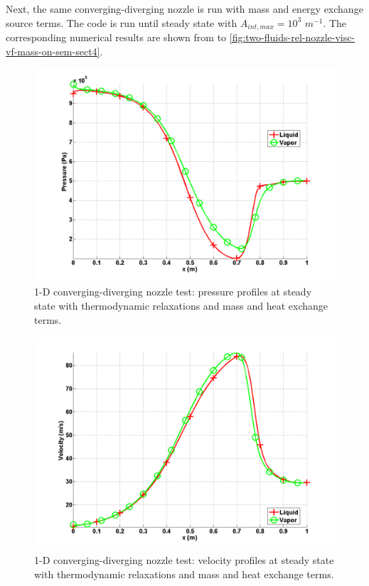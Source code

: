 Next, the same converging-diverging nozzle is run with mass and energy exchange source terms. The code is run until steady state with $A_{int,max}=10^3$ $m^{-1}$. The corresponding numerical results are shown from  to \ref{fig:two-fluids-rel-nozzle-visc-vf-mass-on-sem-sect4}.
%
\begin{figure}[H]
\centering
\includegraphics[width=\textwidth]{figures/SEM/Aint1e3MassOn_two_phases_pressure.png}
\caption{1-D converging-diverging nozzle test: pressure profiles at steady state with thermodynamic relaxations and mass and heat exchange terms.}
\label{fig:two-fluids-rel-nozzle-press-mass-on-sem-sect4}
\end{figure}
%
\begin{figure}[H]
\centering
\includegraphics[width=\textwidth]{figures/SEM/Aint1e3MassOn_two_phases_velocity.png}
\caption{1-D converging-diverging nozzle test: velocity profiles at steady state with thermodynamic relaxations and mass and heat exchange terms.}
\label{fig:two-fluids-rel-nozzle-vel-mass-on-sem-sect4}
\end{figure}
